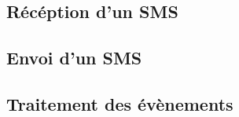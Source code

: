 \subsection{Récéption d'un SMS}


\subsection{Envoi d'un SMS}


\subsection{Traitement des évènements}
\\


